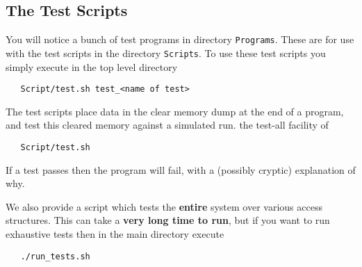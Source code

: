 \subsection{The Test Scripts}
You will notice a bunch of test programs in directory
\verb+Programs+. These are for use with the test scripts
in the directory \verb+Scripts+.
To use these test scripts you simply execute in the 
top level directory
\begin{verbatim}
   Script/test.sh test_<name of test>
\end{verbatim}
The test scripts place data in the clear memory dump
at the end of a program, and test this cleared memory against
a simulated run.
the test-all facility of
\begin{verbatim}
   Script/test.sh 
\end{verbatim}
If a test passes then the program will fail, with a
(possibly cryptic) explanation of why.

We also provide a script which tests the {\bf entire}
system over various access structures. This can
take a {\bf very long time to run}, but if you want to
run exhaustive tests then in the main directory
execute
\begin{verbatim}
   ./run_tests.sh
\end{verbatim}

